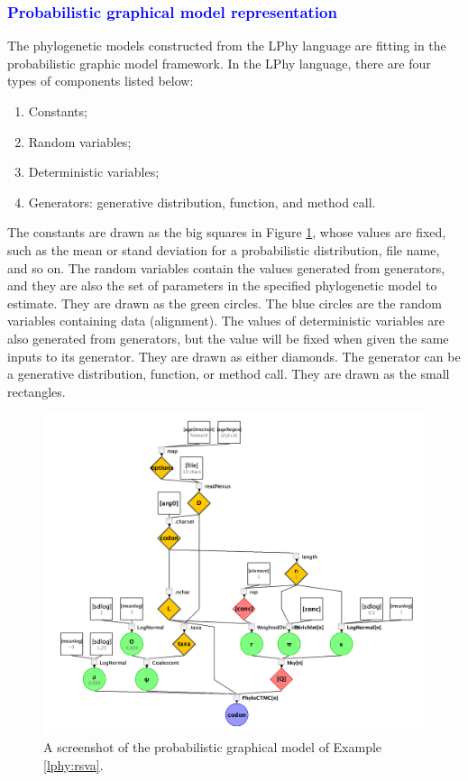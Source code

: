 \documentclass[10pt,letterpaper,table]{article}
\begin{document}
\textcolor{blue}{\subsubsection{Probabilistic graphical model representation}}

The phylogenetic models constructed from the LPhy language are fitting in the probabilistic graphic model framework\cite{}.
In the LPhy language, there are four types of components listed below:

\begin{enumerate}
    \item Constants;
    \item Random variables;
    \item Deterministic variables;
    \item Generators: generative distribution, function, and method call.
\end{enumerate}

The constants are drawn as the big squares in Figure \ref{fig:RSV2PGM}, whose values are fixed, such as the mean or stand deviation for a probabilistic distribution, file name, and so on. 
The random variables contain the values generated from generators, and they are also the set of parameters in the specified phylogenetic model to estimate. They are drawn as the green circles. The blue circles are the random variables containing data (alignment).
The values of deterministic variables are also generated from generators, but the value will be fixed when given the same inputs to its generator. They are drawn as either diamonds.
The generator can be a generative distribution, function, or method call. They are drawn as the small rectangles.
 

\begin{figure}
  \includegraphics[width=\textwidth]{figs/RSV2.png}
  \caption{A screenshot of the probabilistic graphical model of Example \ref{lphy:rsva}.} 
  \label{fig:RSV2PGM}
\end{figure}
\end{document}
